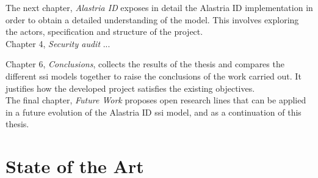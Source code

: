 \documentclass[a4paper, 12pt]{article} %
\begin{document}
            The next chapter, \textit{Alastria ID} exposes in detail the Alastria ID implementation in order to obtain a detailed understanding of the model. This involves exploring the actors, specification and structure of the project.\\
            
            Chapter 4, \textit{Security audit} ... 
            
            Chapter 6, \textit{Conclusions}, collects the results of the thesis and compares the different \acrshort{ssi} models together to raise the conclusions of the work carried out. It justifies how the developed project satisfies the existing objectives.\\
            
            The final chapter, \textit{Future Work} proposes open research lines that can be applied in a future evolution of the Alastria ID \acrshort{ssi} model, and as a continuation of this thesis.

\newpage
        
\section{State of the Art}
\end{document}
